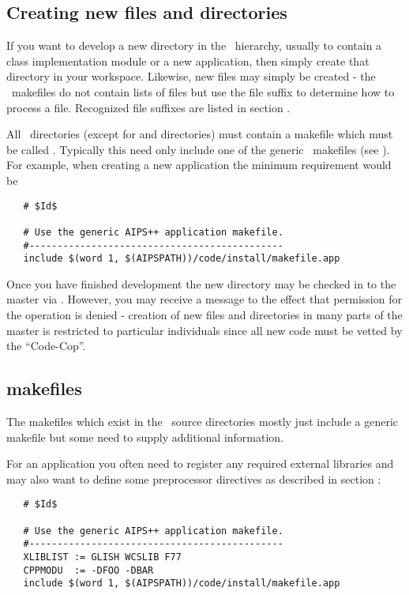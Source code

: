\subsection*{Creating new files and directories}

If you want to develop a new directory in the \aipspp\ hierarchy, usually to
contain a class implementation module or a new application, then simply create
that directory in your workspace.  Likewise, new files may simply be created -
the \aipspp\ makefiles do not contain lists of files but use the file suffix
to determine how to process a file.  Recognized file suffixes are listed in
section .

All \aipspp\ directories (except for  and 
directories) must contain a makefile which must be called .
Typically this need only include one of the generic \aipspp\ makefiles (see
).  For example, when creating a new application the minimum
requirement would be

\begin{verbatim}
   # $Id$
 
   # Use the generic AIPS++ application makefile.
   #---------------------------------------------
   include $(word 1, $(AIPSPATH))/code/install/makefile.app
\end{verbatim}

\noindent
Once you have finished development the new directory may be checked in to the
master via .  However, you may receive a message to the effect that
permission for the operation is denied - creation of new files and directories
in many parts of the master is restricted to particular individuals since all
new code must be vetted by the ``Code-Cop''.

\subsection*{makefiles}

The makefiles which exist in the \aipspp\ source directories mostly just
include a generic makefile but some need to supply additional information.

For an application you often need to register any required external libraries
and may also want to define some preprocessor directives as described in
section :
 
\begin{verbatim}
   # $Id$
 
   # Use the generic AIPS++ application makefile.
   #---------------------------------------------
   XLIBLIST := GLISH WCSLIB F77
   CPPMODU  := -DFOO -DBAR
   include $(word 1, $(AIPSPATH))/code/install/makefile.app
\end{verbatim}

